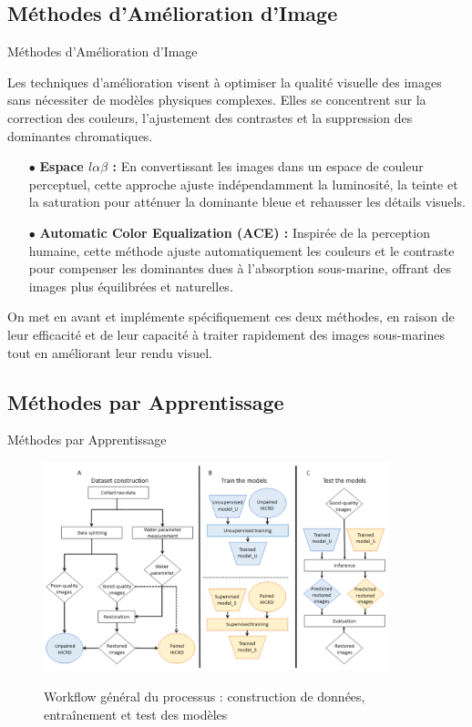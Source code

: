 \documentclass[8pt,a4paper]{beamer}
\numberwithin{figure}{section}
\begin{document}
\subsection{Méthodes d'Amélioration d'Image}
\begin{frame}{Méthodes d'Amélioration d'Image}
\par Les techniques d’amélioration visent à optimiser la qualité visuelle des images sans nécessiter de modèles physiques complexes. Elles se concentrent sur la correction des couleurs, l'ajustement des contrastes et la suppression des dominantes chromatiques.
\vspace{3mm}
\begin{itemize}
\item[$\bullet$] \textbf{Espace $l\alpha\beta$ :} En convertissant les images dans un espace de couleur perceptuel, cette approche ajuste indépendamment la luminosité, la teinte et la saturation pour atténuer la dominante bleue et rehausser les détails visuels.
\item[$\bullet$] \textbf{Automatic Color Equalization (ACE) :} Inspirée de la perception humaine, cette méthode ajuste automatiquement les couleurs et le contraste pour compenser les dominantes dues à l’absorption sous-marine, offrant des images plus équilibrées et naturelles.
\end{itemize}
\vspace{3mm}
On met en avant et implémente spécifiquement ces deux méthodes, en raison de leur efficacité et de leur capacité à traiter rapidement des images sous-marines tout en améliorant leur rendu visuel.
\end{frame}

\subsection{Méthodes par Apprentissage}
\begin{frame}{Méthodes par Apprentissage}
\begin{center}
\begin{figure}[h!]
\includegraphics[width=10cm]{image014.png}
\label{fig1}
\caption{Workflow général du processus : construction de données, entraînement et test des modèles}
\end{figure} 
\end{center}
\end{frame}
\end{document}
